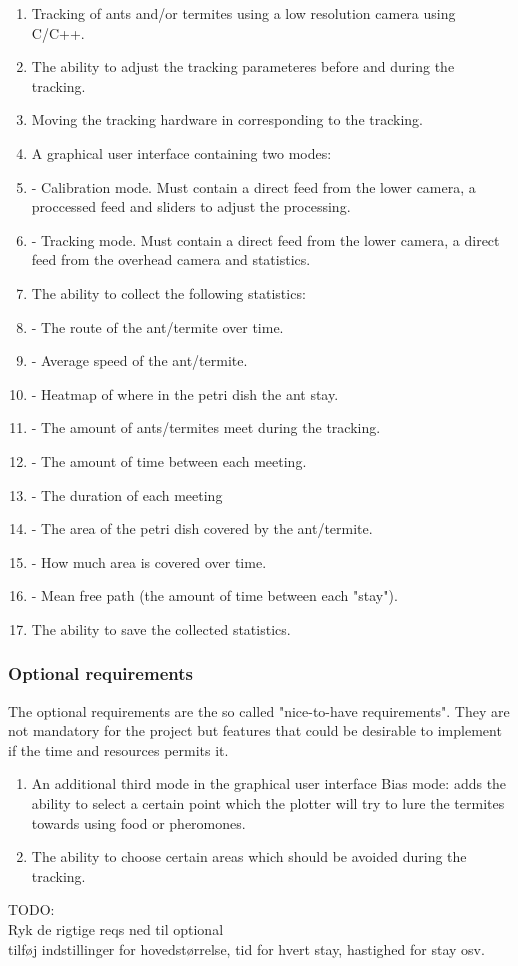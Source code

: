 \begin{enumerate}
    \item Tracking of ants and/or termites using a low resolution camera using C/C++.
    \item The ability to adjust the tracking parameteres before and during the tracking.
    \item Moving the tracking hardware in corresponding to the tracking.
	\item A graphical user interface containing two modes:
    \item - Calibration mode. Must contain a direct feed from the lower camera, a proccessed feed and sliders to adjust the processing.
    \item - Tracking mode. Must contain a direct feed from the lower camera, a direct feed from the overhead camera and statistics.
    \item The ability to collect the following statistics:
    \item - The route of the ant/termite over time. 
    \item - Average speed of the ant/termite.
    \item - Heatmap of where in the petri dish the ant stay.
    \item - The amount of ants/termites meet during the tracking.
    \item - The amount of time between each meeting.
    \item - The duration of each meeting
    \item - The area of the petri dish covered by the ant/termite.
    \item - How much area is covered over time.
    \item - Mean free path (the amount of time between each "stay").
    \item The ability to save the collected statistics.
\end{enumerate}

\subsubsection{Optional requirements}
The optional requirements are the so called "nice-to-have requirements". They are not mandatory for the project but features that could be desirable to implement if the time and resources permits it.

\begin{enumerate}
	\item An additional third mode in the graphical user interface Bias mode: adds the ability to select a certain point which the plotter will try to lure the termites towards using food or pheromones.
    \item The ability to choose certain areas which should be avoided during the tracking.
\end{enumerate}

TODO: \\
Ryk de rigtige reqs ned til optional \\
tilføj indstillinger for hovedstørrelse, tid for hvert stay, hastighed for stay osv.


